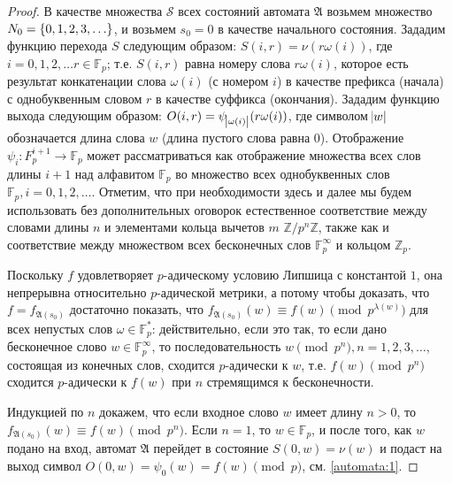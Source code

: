 \documentclass[och, master]{SCWorks}
\theoremstyle{plain}
\theoremstyle{plain}
\theoremstyle{plain}
\theoremstyle{definition}
\begin{document}
\begin{proof}
В качестве множества $\mathcal{S}$ всех состояний автомата $\mathfrak{A}$ возьмем множество $\mathbb \mathbb N_{0} = \{0, 1, 2, 3, \ldots\}$, и возьмем $s_0 = 0$ в качестве начального состояния. Зададим функцию перехода $S$ следующим образом: $S(i, r) = \nu(r\omega(i))$, где $i = 0, 1, 2, \ldots r \in \mathbb F_p$; т.е. $S(i, r)$ равна номеру слова $r\omega(i)$, которое есть результат конкатенации слова $\omega(i)$ (с номером $i$) в качестве префикса (начала) с однобуквенным словом $r$ в качестве суффикса (окончания). Зададим функцию выхода следующим образом: $O(i, r) = \psi_{\abs{\omega(i)}}(r\omega(i))$, где символом $\abs{w}$ обозначается длина слова $w$ (длина пустого слова равна $0$). Отображение $\psi_i : F^{i+1}_p \rightarrow \mathbb F_p$ может рассматриваться как отображение множества всех слов длины $i + 1$ над алфавитом $\mathbb F_p$ во множество всех однобуквенных слов $\mathbb F_p, i = 0, 1, 2, \ldots$. Отметим, что при необходимости здесь и далее мы будем использовать без дополнительных оговорок естественное соответствие между словами длины $n$ и элементами кольца вычетов $m$ $\mathbb Z/p^n\mathbb Z$, также как и соответствие между множеством всех бесконечных слов $\mathbb F^\infty_p$ и кольцом $\mathbb Z_p$.

Поскольку $f$ удовлетворяет $p$-адическому условию Липшица с константой $1$, она непрерывна относительно $p$-адической метрики, а потому чтобы доказать, что $f=f_{\mathfrak{A}(s_0)}$ достаточно показать, что $f_{\mathfrak{A}(s_0)}(w) \equiv f(w)\pmod p^{\lambda(w)}$ для всех непустых слов $\omega \in \mathbb F_p^{*}$: действительно, если это так, то если дано бесконечное слово $w \in \mathbb F^\infty_p$, то последовательность $w \pmod {p^n}, n = 1, 2, 3, \ldots$, состоящая из конечных слов, сходится $p$-адически к $w$, т.е. $f(w) \pmod {p^n}$ сходится $p$-адически к $f(w)$ при $n$ стремящимся к бесконечности. 

Индукцией по $n$ докажем, что если входное слово $w$ имеет длину $n > 0$, то $f_{\mathfrak{A}(s_0)}(w) \equiv f(w) \pmod {p^n}$. Если $n = 1$, то $w \in \mathbb F_p$, и после того, как $w$ подано на вход, автомат $\mathfrak{A}$ перейдет в состояние $S(0, w) = \nu(w)$ и подаст на выход символ $O(0, w) = \psi_0(w) = f(w) \pmod p$, см. \eqref{automata:1}. 


\end{proof}
\end{document}
